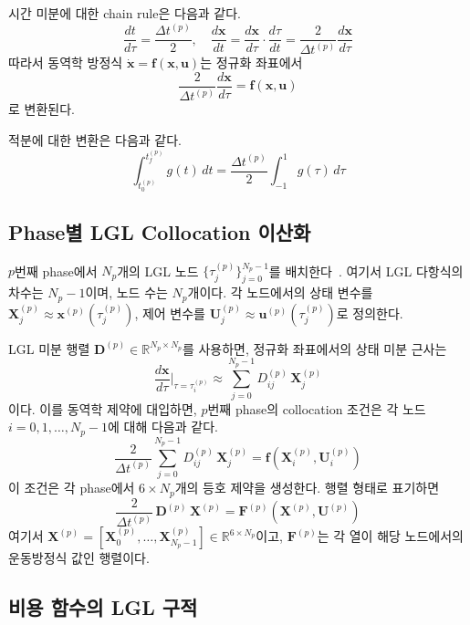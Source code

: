\documentclass[11pt]{article}
\begin{document}
시간 미분에 대한 chain rule은 다음과 같다.
\[
\frac{dt}{d\tau} = \frac{\Delta t^{(p)}}{2}, \quad \frac{d\mathbf{x}}{dt} = \frac{d\mathbf{x}}{d\tau} \cdot \frac{d\tau}{dt} = \frac{2}{\Delta t^{(p)}} \frac{d\mathbf{x}}{d\tau}
\]
따라서 동역학 방정식 $\dot{\mathbf{x}} = \mathbf{f}(\mathbf{x}, \mathbf{u})$는 정규화 좌표에서
\[
\frac{2}{\Delta t^{(p)}} \frac{d\mathbf{x}}{d\tau} = \mathbf{f}(\mathbf{x}, \mathbf{u})
\]
로 변환된다.

적분에 대한 변환은 다음과 같다.
\[
\int_{t_0^{(p)}}^{t_f^{(p)}} g(t) \, dt = \frac{\Delta t^{(p)}}{2} \int_{-1}^{1} g(\tau) \, d\tau
\]


\subsection{Phase별 LGL Collocation 이산화}
\label{sec:lgl_discretization}

$p$번째 phase에서 $N_p$개의 LGL 노드 $\{\tau_j^{(p)}\}_{j=0}^{N_p-1}$를 배치한다~\cite{Benson2006}.
여기서 LGL 다항식의 차수는 $N_p - 1$이며, 노드 수는 $N_p$개이다.
각 노드에서의 상태 변수를 $\mathbf{X}_j^{(p)} \approx \mathbf{x}^{(p)}(\tau_j^{(p)})$, 제어 변수를 $\mathbf{U}_j^{(p)} \approx \mathbf{u}^{(p)}(\tau_j^{(p)})$로 정의한다.

LGL 미분 행렬 $\mathbf{D}^{(p)} \in \mathbb{R}^{N_p \times N_p}$를 사용하면, 정규화 좌표에서의 상태 미분 근사는
\[
\frac{d\mathbf{x}}{d\tau}\bigg|_{\tau = \tau_i^{(p)}} \approx \sum_{j=0}^{N_p-1} D_{ij}^{(p)} \, \mathbf{X}_j^{(p)}
\]
이다. 이를 동역학 제약에 대입하면, $p$번째 phase의 collocation 조건은 각 노드 $i = 0, 1, \ldots, N_p - 1$에 대해 다음과 같다.
\begin{equation}
\label{eq:collocation}
\frac{2}{\Delta t^{(p)}} \sum_{j=0}^{N_p-1} D_{ij}^{(p)} \, \mathbf{X}_j^{(p)} = \mathbf{f}(\mathbf{X}_i^{(p)}, \mathbf{U}_i^{(p)})
\end{equation}
이 조건은 각 phase에서 $6 \times N_p$개의 등호 제약을 생성한다.
행렬 형태로 표기하면
\[
\frac{2}{\Delta t^{(p)}} \, \mathbf{D}^{(p)} \, \boldsymbol{X}^{(p)} = \mathbf{F}^{(p)}(\boldsymbol{X}^{(p)}, \boldsymbol{U}^{(p)})
\]
여기서 $\boldsymbol{X}^{(p)} = [\mathbf{X}_0^{(p)}, \ldots, \mathbf{X}_{N_p-1}^{(p)}] \in \mathbb{R}^{6 \times N_p}$이고, $\mathbf{F}^{(p)}$는 각 열이 해당 노드에서의 운동방정식 값인 행렬이다.


\subsection{비용 함수의 LGL 구적}
\label{sec:cost_quadrature}
\end{document}
